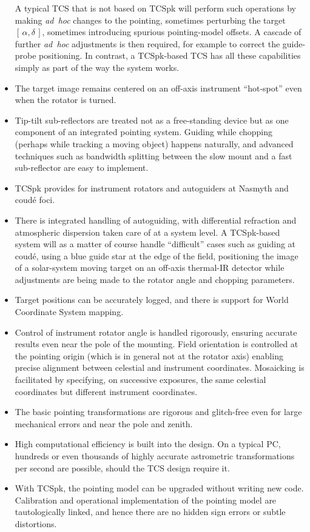 \documentclass[12pt,fleqn,twoside]{article}
\renewcommand{\_}{{\tt\char'137}}     %
\newcommand{\radec}     {$[\,\alpha,\delta\,]$}
\begin{document}
\begin{itemize}
      A typical TCS that is not based on TCSpk will
      perform such operations by making {\it ad~hoc}\/ changes
      to the pointing, sometimes perturbing the target \radec,
      sometimes introducing spurious pointing-model offsets.  A cascade
      of further {\it ad~hoc}\/ adjustments is then required, for
      example to correct the guide-probe positioning.  In
      contrast, a TCSpk-based TCS has all these capabilities
      simply as part of the way the system works.
\item The target image remains centered on an off-axis instrument
      ``hot-spot'' even when the rotator is turned.
\item Tip-tilt sub-reflectors are treated not as a free-standing
      device but as one component of an integrated pointing
      system.  Guiding while chopping (perhaps while tracking a
      moving object) happens naturally, and advanced techniques such as
      bandwidth splitting between the slow mount and a fast
      sub-reflector are easy to implement.
\item TCSpk provides for instrument rotators and autoguiders
      at Nasmyth and coud\'{e} foci.
\item There is integrated handling of autoguiding, with differential
      refraction and atmospheric dispersion taken care of at a
      system level.  A TCSpk-based system will as a matter
      of course handle ``difficult''
      cases such as guiding at coud\'e, using
      a blue guide star at the edge of the field, positioning the
      image of a solar-system moving
      target on an off-axis thermal-IR detector while adjustments are
      being made to the rotator angle and chopping parameters.
\item Target positions can be accurately logged, and there is
      support for World Coordinate System mapping.
\item Control of instrument rotator angle is handled rigorously,
      ensuring accurate results even near the pole of the mounting.
      Field orientation is controlled at the pointing origin
      (which is in general not at the rotator axis) enabling
      precise alignment between celestial and instrument coordinates.
      Mosaicking is facilitated by specifying, on successive exposures,
      the same celestial coordinates but different instrument coordinates.
\item The basic pointing transformations are rigorous and glitch-free
      even for large mechanical
      errors and near the pole and zenith.
\item High computational efficiency is built into the
      design.  On a typical PC, hundreds or even thousands
      of highly accurate astrometric transformations per second
      are possible, should the TCS design require it.
\item With TCSpk, the pointing model can be upgraded without writing
      new code.  Calibration and operational implementation of
      the pointing model are tautologically linked, and hence there
      are no hidden sign errors or subtle distortions.
\end{itemize}
\end{document}
